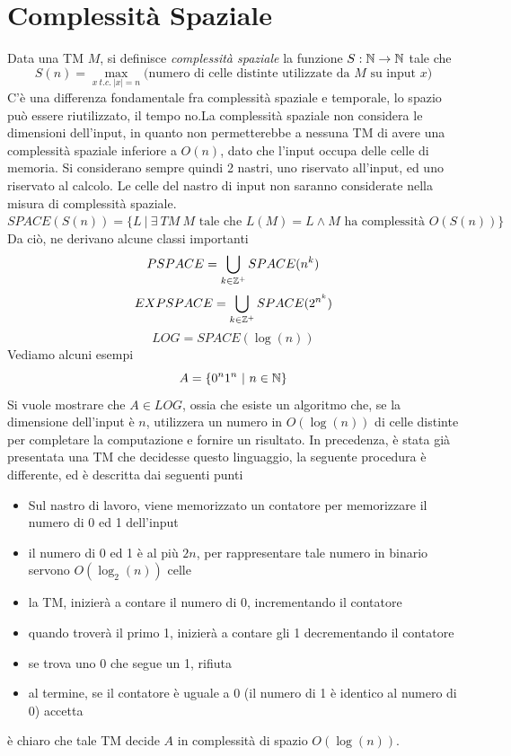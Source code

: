 \documentclass[10pt, letterpaper]{report}
\begin{document}
\chapter{Complessità Spaziale}
Data una TM $M$, si definisce \textit{complessità spaziale} la funzione $S:{\mathbb N}\rightarrow {\mathbb N}$ tale che 
$$ S(n)=\max_{x \ t.c. \ |x|=n}\Big(
\text{numero di celle distinte utilizzate da $M$ su input $x$}    
\Big) $$
C'è una differenza fondamentale fra complessità spaziale e temporale, lo spazio può essere riutilizzato, il tempo no.\acc  La complessità spaziale non considera le dimensioni dell'input, in quanto non permetterebbe a nessuna TM di avere una complessità spaziale inferiore a $O(n)$, dato che l'input occupa delle celle di memoria. Si considerano sempre quindi 2 nastri, uno riservato all'input, ed uno riservato al calcolo. Le celle del nastro di input non saranno considerate nella misura di complessità spaziale.\acc 
{} $SPACE(S(n))=\{ L \ | \ \exists \ TM \ M \text{ tale che }L(M)=L \land  M \text{ ha complessità }O(S(n))\}$
Da ciò, ne derivano alcune classi importanti 
$$ PSPACE = \bigcup_{k\in {\mathbb Z}^+}SPACE(n^k)$$
$$ EXPSPACE = \bigcup_{k\in {\mathbb Z}^+}SPACE(2^{n^k})$$
$$ LOG = SPACE(\log(n))$$
Vediamo alcuni esempi 
$$ A=\{0^n1^n \ | \ n\in {\mathbb N}\}$$
Si vuole mostrare che $A\in LOG$, ossia che esiste un algoritmo che, se la dimensione dell'input è $n$, utilizzera un numero in $O(\log(n))$ di celle distinte per completare la computazione e fornire un risultato.\acc 
In precedenza, è stata già presentata una TM che decidesse questo linguaggio, la seguente procedura è differente, ed è descritta dai seguenti punti\begin{itemize}
    \item Sul nastro di lavoro, viene memorizzato un contatore per memorizzare il numero di 0 ed 1 dell'input 
    \item il numero di 0 ed 1 è al più $2n$, per rappresentare tale numero in binario servono $O(\log_2(n))$ celle 
    \item la TM, inizierà a contare il numero di 0, incrementando il contatore 
    \item quando troverà il primo 1, inizierà a contare gli 1 decrementando il contatore 
    \item se trova uno 0 che segue un 1, rifiuta 
    \item al termine, se il contatore è uguale a 0 (il numero di 1 è identico al numero di 0) accetta 
\end{itemize}
è chiaro che tale TM decide $A$ in complessità di spazio $O(\log(n))$.\acc 
\end{document}
